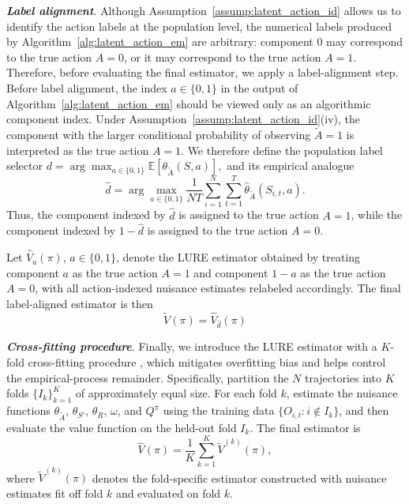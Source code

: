 \documentclass[12pt]{article}
\newcommand{\0}{\boldsymbol{0}}
\newcommand{\E}{\mathbb{E}}
\begin{document}
\textbf{\textit{Label alignment}}.
Although Assumption~\ref{assump:latent_action_id} allows us to identify the action labels at the population level, the numerical labels produced by Algorithm~\ref{alg:latent_action_em} are arbitrary: component \(0\) may correspond to the true action \(A=0\), or it
may correspond to the true action \(A=1\). Therefore, before evaluating the final estimator, we apply a label-alignment step.
Before label alignment, the index \(a\in\{0,1\}\) in the output of Algorithm~\ref{alg:latent_action_em} should be viewed only as an algorithmic component index. Under Assumption~\ref{assump:latent_action_id}(iv), the component with the larger conditional probability of observing \(\widetilde A=1\) is interpreted as the true action \(A=1\). We therefore define the population label selector
$d=\arg\max_{a\in\{0,1\}}\E[\theta_{\widetilde A}(S,a)],
$
and its empirical analogue
\[
\widehat d
=\arg\max_{a\in\{0,1\}}\frac{1}{NT}\sum_{i=1}^N\sum_{t=1}^T \widehat\theta_{\widetilde A}(S_{i,t},a).
\]
Thus, the component indexed by \(\widehat d\) is assigned to the true action \(A=1\), while the component indexed by \(1-\widehat d\) is assigned to the true action \(A=0\).

Let \(\widehat V_a(\pi)\), \(a\in\{0,1\}\), denote the LURE estimator obtained by treating component \(a\) as the true action \(A=1\) and component \(1-a\) as the true action \(A=0\), with all action-indexed nuisance estimates relabeled accordingly. The final label-aligned estimator is then
\[
\widetilde V(\pi)=\widehat V_{\widehat d}(\pi)%
\]

\textbf{\textit{Cross-fitting procedure}}.
Finally, we introduce the LURE estimator with a $K$-fold cross-fitting procedure \citep{schick1986asymptotically,chernozhukov2018double}, which mitigates overfitting bias and helps control the empirical-process remainder. Specifically, partition the $N$ trajectories into $K$ folds $\{I_k\}_{k=1}^K$ of approximately equal size. For each fold $k$, estimate the nuisance functions $\theta_{\widetilde A}$, $\theta_{S'}$, $\theta_R$, $\omega$, and $ Q^\pi$ using the training data $\{O_{i,t}: i \notin I_k\}$, and then evaluate the value function on the held-out fold $I_k$. The final estimator is
\[
\widehat V(\pi) = \frac{1}{K}\sum_{k=1}^K \widetilde V^{(k)}(\pi),
\]
where $\widetilde V^{(k)}(\pi)$ denotes the fold-specific estimator constructed with nuisance estimates fit off fold $k$ and evaluated on fold $k$.
\end{document}
